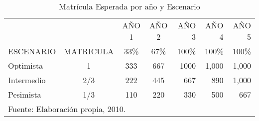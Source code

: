 \begin{table}[h]
    \centering
    \caption{Matrícula Esperada por año y Escenario}
    \label{tbl:MatriculaEsperada}
    \begin{tabular}{l|c|c|c|r|r|r}
                   &           & AÑO 1 & AÑO 2 & AÑO 3  & AÑO 4  & AÑO 5 \\
        ESCENARIO  & MATRICULA & 33\%  & 67\%  & 100\%  & 100\%  & 100\% \\
        \hline                                                  
        \hline                                                  
        Optimista  & 1         & 333   & 667   & 1000   & 1,000  & 1,000  \\
        Intermedio & 2/3       & 222   & 445   & 667    & 890    & 1,000  \\
        Pesimista  & 1/3       & 110   & 220   & 330    & 500    & 667    \\
        \hline
        \multicolumn{7}{l}{\footnotesize Fuente: Elaboración propia, 2010.}
    \end{tabular}
\end{table}

